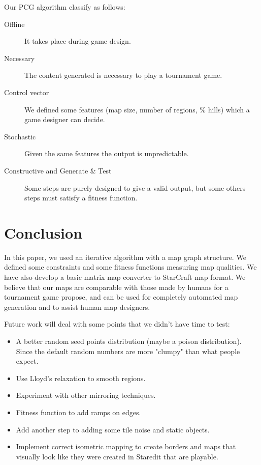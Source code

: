 \documentclass[letterpaper]{article}
\begin{document}
Our PCG algorithm classify as follows:
\begin{description}
	\item[Offline] It takes place during game design.
	\item[Necessary] The content generated is necessary to play a tournament game.
	\item[Control vector] We defined some features (map size, number of regions, \% hills) which a game designer can decide.
	\item[Stochastic] Given the same features the output is unpredictable.
	\item[Constructive and Generate \& Test] Some steps are purely designed to give a valid output, but some others steps must satisfy a fitness function.
\end{description}



\section{Conclusion} %
\label{sec:conclusion}
In this paper, we used an iterative algorithm with a map graph structure. We defined some constraints and some ﬁtness functions measuring map qualities. We have also develop a basic matrix map converter to StarCraft map format. We believe that our maps are comparable with those made by humans for a tournament game propose, and can be used for completely automated map generation and to assist human map designers.

Future work will deal with some points that we didn't have time to test:
\begin{itemize}
	\item A better random seed points distribution (maybe a poison distribution). Since the default random numbers are more "clumpy" than what people expect.
	\item Use Lloyd's relaxation to smooth regions.
	\item Experiment with other mirroring techniques.
	\item Fitness function to add ramps on edges.
	\item Add another step to adding some tile noise and static objects.
	\item Implement correct isometric mapping to create borders and maps that visually look like they were created in Staredit that are playable.
\end{itemize}





\end{document}
